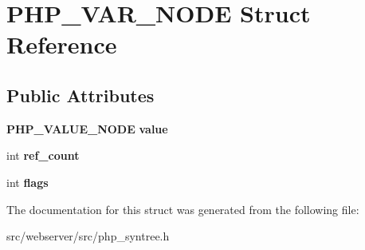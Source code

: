 \section{PHP\_\-VAR\_\-NODE Struct Reference}
\label{structPHP__VAR__NODE}
\subsection*{Public Attributes}
\begin{DoxyCompactItemize}
\item 
{\bf PHP\_\-VALUE\_\-NODE} {\bfseries value}\label{structPHP__VAR__NODE_ae91ed9fc7e7c04e1a4efa398dc0954da}

\item 
int {\bfseries ref\_\-count}\label{structPHP__VAR__NODE_a54f111cf9cdb46a2208324f2846e66b4}

\item 
int {\bfseries flags}\label{structPHP__VAR__NODE_ae9e2accc8bb43adaff937586ae23ee91}

\end{DoxyCompactItemize}


The documentation for this struct was generated from the following file:\begin{DoxyCompactItemize}
\item 
src/webserver/src/php\_\-syntree.h\end{DoxyCompactItemize}
